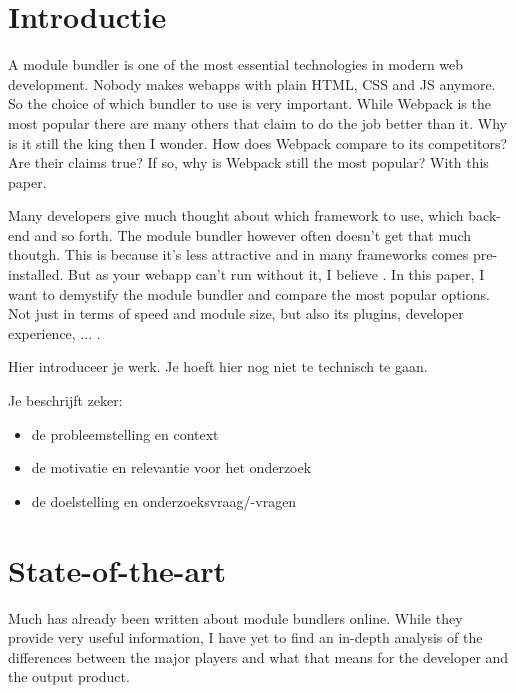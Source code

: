 
\section{Introductie} %
\label{sec:introductie}

A module bundler is one of the most essential technologies in modern web development. Nobody makes webapps with plain HTML, CSS and JS anymore. So the choice of which bundler to use is very important.
While Webpack is the most popular there are many others that claim to do the job better than it. Why is it still the king then I wonder. How does Webpack compare to its competitors? Are their claims true? If so, why is Webpack still the most popular? With this paper. 

Many developers give much thought about which framework to use, which back-end and so forth. The module bundler however often doesn't get that much thoutgh. This is because it's less attractive and in many frameworks comes pre-installed. But as your webapp can't run without it, I believe . In this paper, I want to demystify the module bundler and compare the most popular options. Not just in terms of speed and module size, but also its plugins, developer experience, ... .

Hier introduceer je werk. Je hoeft hier nog niet te technisch te gaan.

Je beschrijft zeker:

\begin{itemize}
  \item de probleemstelling en context
  \item de motivatie en relevantie voor het onderzoek
  \item de doelstelling en onderzoeksvraag/-vragen
\end{itemize}


\section{State-of-the-art}
\label{sec:state-of-the-art}

Much has already been written about module bundlers online. While they provide very useful information, I have yet to find an in-depth analysis of the differences between the major players and what that means for the developer and the output product.

